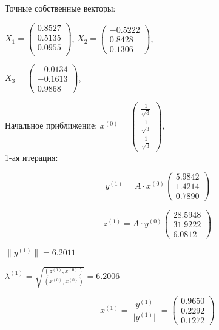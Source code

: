 \documentclass{article}
\begin{document}
	Точные собственные векторы:

	$X_1 = \begin{pmatrix}
		0.8527\\
		0.5135\\
		0.0955\\
	\end{pmatrix}$,
	$X_2 =\begin{pmatrix}
	-0.5222\\
	0.8428\\
	0.1306
	\end{pmatrix}$,
	
	$X_3 =\begin{pmatrix}
		-0.0134\\
		-0.1613\\
		0.9868
	\end{pmatrix}$,
	
	Начальное приближение:
	$x^{(0)}=\begin{pmatrix}
		\frac{1}{\sqrt{3}}\\
		\frac{1}{\sqrt{3}}\\
		\frac{1}{\sqrt{3}}
	\end{pmatrix}$,
		~\\
		
	1-ая итерация:
	
	\[y^{(1)} = A \cdot x^{(0)}							
	\left(
	\begin{array}{ccc}
		5.9842 \\
		1.4214 \\
		0.7890
	\end{array}
	\right) \] 
	
	\[z^{(1)} = A \cdot y^{(0)}							
	\left(
	\begin{array}{ccc}
		28.5948 \\
		31.9222 \\
		6.0812
	\end{array}
	\right) \] 
	
	$\|y^{(1)}\| = 6.2011$
	
	
	$\lambda^{(1)} = \sqrt{\frac{(z^{(1)}, x^{(0)})}	{(x^{(0)}, x^{(0)})}} =  6.2006$
	
	
	\[x^{(1)} = \frac{y^{(1)}}{||y^{(1)}||}= 							
	\left(
	\begin{array}{ccc}
		0.9650  \\
		0.2292  \\
		0.1272
	\end{array}
	\right) \] 
	
\end{document}
